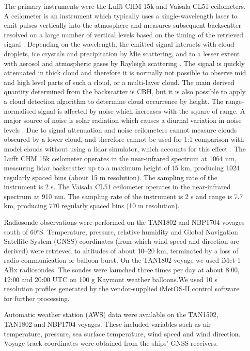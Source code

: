 The primary instruments were the Lufft CHM 15k and Vaisala CL51 ceilometers. A
ceilometer is an instrument which typically uses a single-wavelength laser to
emit pulses vertically into the atmosphere and measures subsequent backscatter
resolved on a large number of vertical levels based on the timing of the
retrieved signal \citep{emeis2010}. Depending on the wavelength, the emitted
signal interacts with cloud droplets, ice crystals and precipitation by Mie
scattering, and to a lesser extent with aerosol and atmospheric gases by
Rayleigh scattering \citep{bohren2008}. The signal is quickly attenuated in
thick cloud and therefore it is normally not possible to observe mid and high
level parts of such a cloud, or a multi-layer cloud. The main derived quantity
determined from the backscatter is CBH, but it is also possible to apply a cloud
detection algorithm to determine cloud occurrence by height. The
range-normalised signal is affected by noise which increases with the square of
range. A major source of noise is solar radiation which causes a diurnal
variation in noise levels \citep{kotthaus2016}. Due to signal attenuation and
noise ceilometers cannot measure clouds obscured by a lower cloud, and therefore
cannot be used for 1:1 comparison with model clouds without using a lidar
simulator, which accounts for this effect \citep{chepfer2008}. The Lufft CHM 15k
ceilometer operates in the near-infrared spectrum at 1064 nm, measuring lidar
backscatter up to a maximum height of 15 \unit{km}, producing 1024 regularly
spaced bins (about 15 m resolution). The sampling rate of the instrument is 2
\unit{s}. The Vaisala CL51 ceilometer operates in the near-infrared spectrum at
910 nm. The sampling rate of the instrument is 2 \unit{s} and range is 7.7
\unit{km}, producing 770 regularly spaced bins (10 m resolution).

Radiosonde observations were performed on the TAN1802 and NBP1704 voyages south
of 60$^\circ$S.  Temperature, pressure, relative humidity and Global Navigation
Satellite System (GNSS) coordinates
(from which wind speed and direction are derived) were retrieved to altitudes
of about 10--20 \unit{km}, terminated by a loss of radio communication or
balloon burst.
On the TAN1802 voyage we used iMet-1 ABx radiosondes.
The sondes were launched three
times per day at about 8:00, 12:00 and 20:00 UTC on 100 \unit{g} Kaymont
weather balloons.We used 10
\unit{s} resolution profiles generated by the vendor-supplied iMetOS-II control
software for further processing.

Automatic weather station (AWS) data were available on the TAN1502, TAN1802 and
NBP1704 voyages. These included variables such as air temperature, pressure,
sea surface temperature, wind speed and wind direction. Voyage track
coordinates were obtained from the ships' GNSS receivers.


